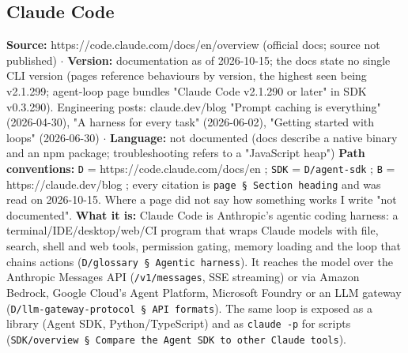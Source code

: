 \small
\subsection{Claude Code}

\textbf{Source:} https://code.claude.com/docs/en/overview (official docs; source not published) $\cdot$ \textbf{Version:} documentation as of 2026-10-15; the docs state no single CLI version (pages reference behaviours by version, the highest seen being v2.1.299; agent-loop page bundles "Claude Code v2.1.290 or later" in SDK v0.3.290). Engineering posts: claude.dev/blog "Prompt caching is everything" (2026-04-30), "A harness for every task" (2026-06-02), "Getting started with loops" (2026-06-30) $\cdot$ \textbf{Language:} not documented (docs describe a native binary and an npm package; troubleshooting refers to a "JavaScript heap")
\textbf{Path conventions:} \texttt{D} = https://code.claude.com/docs/en ; \texttt{SDK} = \texttt{D/\allowbreak{}agent-\allowbreak{}sdk} ; \texttt{B} = https://claude.dev/blog ; every citation is \texttt{page § Section heading} and was read on 2026-10-15. Where a page did not say how something works I write "not documented".
\textbf{What it is:} Claude Code is Anthropic's agentic coding harness: a terminal/IDE/desktop/web/CI program that wraps Claude models with file, search, shell and web tools, permission gating, memory loading and the loop that chains actions (\texttt{D/\allowbreak{}glossary § Agentic harness}). It reaches the model over the Anthropic Messages API (\texttt{/\allowbreak{}v1/\allowbreak{}messages}, SSE streaming) or via Amazon Bedrock, Google Cloud's Agent Platform, Microsoft Foundry or an LLM gateway (\texttt{D/\allowbreak{}llm-\allowbreak{}gateway-\allowbreak{}protocol § API formats}). The same loop is exposed as a library (Agent SDK, Python/TypeScript) and as \texttt{claude -\allowbreak{}p} for scripts (\texttt{SDK/\allowbreak{}overview § Compare the Agent SDK to other Claude tools}).

